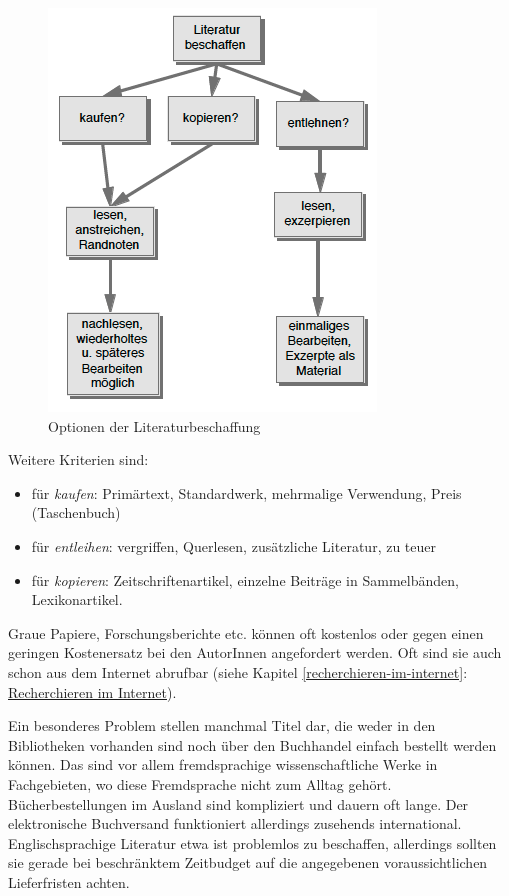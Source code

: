 \documentclass[]{book}
\providecommand{\tightlist}{%
  \setlength{\itemsep}{0pt}\setlength{\parskip}{0pt}}
\theoremstyle{definition}
\theoremstyle{definition}
\theoremstyle{definition}
\theoremstyle{remark}
\begin{document}
\begin{figure}

{\centering \includegraphics{images/recherchieren-literatur-beschaffen-min} 

}

\caption{Optionen der Literaturbeschaffung}\label{fig:unnamed-chunk-9}
\end{figure}

Weitere Kriterien sind:

\begin{itemize}
\tightlist
\item
  für \emph{kaufen}: Primärtext, Standardwerk, mehrmalige Verwendung,
  Preis (Taschenbuch)
\item
  für \emph{entleihen}: vergriffen, Querlesen, zusätzliche Literatur, zu
  teuer
\item
  für \emph{kopieren}: Zeitschriftenartikel, einzelne Beiträge in
  Sammelbänden, Lexikonartikel.
\end{itemize}

Graue Papiere, Forschungsberichte etc. können oft kostenlos oder gegen
einen geringen Kostenersatz bei den AutorInnen angefordert werden. Oft
sind sie auch schon aus dem Internet abrufbar (siehe Kapitel
\ref{recherchieren-im-internet}:
\protect\hyperlink{recherchieren-im-internet}{Recherchieren im
Internet}).

Ein besonderes Problem stellen manchmal Titel dar, die weder in den
Bibliotheken vorhanden sind noch über den Buchhandel einfach bestellt
werden können. Das sind vor allem fremdsprachige wissenschaftliche Werke
in Fachgebieten, wo diese Fremdsprache nicht zum Alltag gehört.
Bücherbestellungen im Ausland sind kompliziert und dauern oft lange. Der
elektronische Buchversand funktioniert allerdings zusehends
international. Englischsprachige Literatur etwa ist problemlos zu
beschaffen, allerdings sollten sie gerade bei beschränktem Zeitbudget
auf die angegebenen voraussichtlichen Lieferfristen achten.
\end{document}
